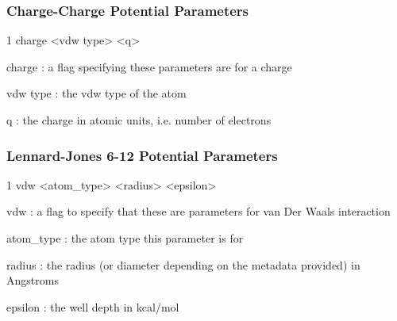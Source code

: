 \subsubsection*{Charge-\/\+Charge Potential Parameters}


\begin{DoxyCode}
1 charge <vdw type> <q>
\end{DoxyCode}



\begin{DoxyItemize}
\item {\ttfamily charge} \+: a flag specifying these parameters are for a charge
\item {\ttfamily vdw type} \+: the vdw type of the atom
\item {\ttfamily q} \+: the charge in atomic units, i.\+e. number of electrons
\end{DoxyItemize}

\subsubsection*{Lennard-\/\+Jones 6-\/12 Potential Parameters}


\begin{DoxyCode}
1 vdw           <atom\_type>               <radius> <epsilon>
\end{DoxyCode}



\begin{DoxyItemize}
\item {\ttfamily vdw} \+: a flag to specify that these are parameters for van Der Waals interaction
\item {\ttfamily atom\+\_\+type} \+: the atom type this parameter is for
\item {\ttfamily radius} \+: the radius (or diameter depending on the metadata provided) in Angstroms
\item {\ttfamily epsilon} \+: the well depth in kcal/mol 
\end{DoxyItemize}